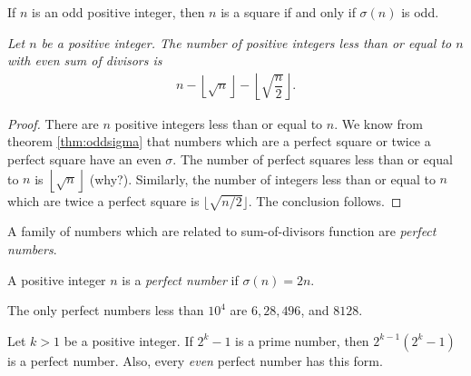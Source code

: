 \documentclass[12pt]{subfile}
\begin{document}
	\begin{corollary}
		If $n$ is an odd positive integer, then $n$ is a square if and only if $\sigma (n)$ is odd.
	\end{corollary}

	\begin{proposition}\slshape
		Let $n$ be a positive integer. The number of positive integers less than or equal to $n$ with even sum of divisors is
		\begin{align*}
			n-\left\lfloor\sqrt{n}\right\rfloor-\left\lfloor\sqrt{\dfrac{n}{2}}\right\rfloor.
		\end{align*}
	\end{proposition}

	\begin{proof}
		There are $n$ positive integers less than or equal to $n$. We know from theorem \ref{thm:oddsigma} that numbers which are a perfect square or twice a perfect square have an even $\sigma$. The number of perfect squares less than or equal to $n$ is $\left\lfloor\sqrt{n}\right\rfloor$ (why?). Similarly, the number of integers less than or equal to $n$ which are twice a perfect square is $\lfloor\sqrt{n/2}\rfloor$. The conclusion follows.
	\end{proof}

	A family of numbers which are related to sum-of-divisors function are \textit{perfect numbers}.

	\begin{definition}
		A positive integer $n$ is a \textit{perfect number} if $\sigma(n)=2n$.
	\end{definition}

	\begin{example}
		The only perfect numbers less than $10^4$ are $6, 28, 496$, and $8128$.
	\end{example}

	\begin{theorem}
		Let $k>1$ be a positive integer. If $2^k-1$ is a prime number, then $2^{k-1}(2^k-1)$ is a perfect number. Also, every \textit{even} perfect number has this form.
	\end{theorem}
\end{document}
